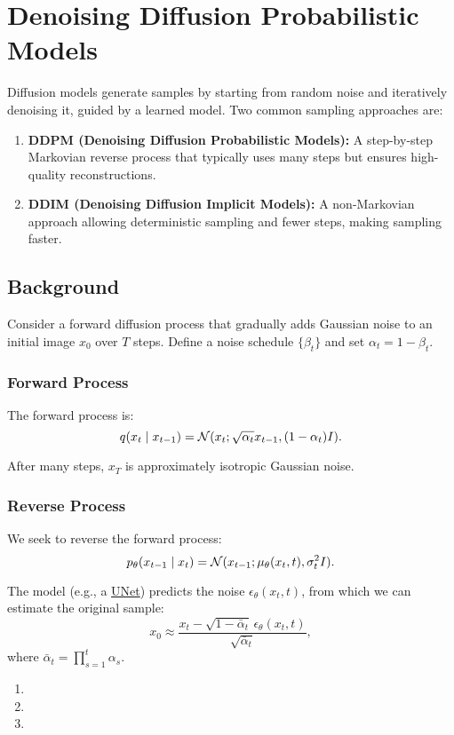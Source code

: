 \section{Denoising Diffusion Probabilistic Models}

Diffusion models generate samples by starting from random noise and iteratively denoising it, guided by a learned model. Two common sampling approaches are:

\begin{enumerate}
    \item \textbf{DDPM (Denoising Diffusion Probabilistic Models):} A step-by-step Markovian reverse process that typically uses many steps but ensures high-quality reconstructions.
    \item \textbf{DDIM (Denoising Diffusion Implicit Models):} A non-Markovian approach allowing deterministic sampling and fewer steps, making sampling faster.
\end{enumerate}

\subsection*{Background}

Consider a forward diffusion process that gradually adds Gaussian noise to an initial image $x_0$ over $T$ steps. Define a noise schedule $\{\beta_t\}$ and set $\alpha_t = 1 - \beta_t$.

\subsubsection*{Forward Process}
The forward process is:
\[
    q(x_t \mid x_{t-1}) = \mathcal{N}(x_t; \sqrt{\alpha_t}x_{t-1}, (1-\alpha_t)I).
\]

After many steps, $x_T$ is approximately isotropic Gaussian noise.

\subsubsection*{Reverse Process}
We seek to reverse the forward process:
\[
    p_\theta(x_{t-1} \mid x_t) = \mathcal{N}(x_{t-1}; \mu_\theta(x_t, t), \sigma_t^2 I).
\]

The model (e.g., a \href{https://arxiv.org/pdf/1505.04597}{UNet}) predicts the noise $\epsilon_\theta(x_t, t)$, from which we can estimate the original sample:
\[
x_0 \approx \frac{x_t - \sqrt{1-\bar{\alpha}_t}\,\epsilon_\theta(x_t,t)}{\sqrt{\bar{\alpha}_t}},
\]
where $\bar{\alpha}_t = \prod_{s=1}^t \alpha_s$.

\begin{enumerate}[label=(\alph*)]
    \item 

    \item 

    \item 
\end{enumerate}